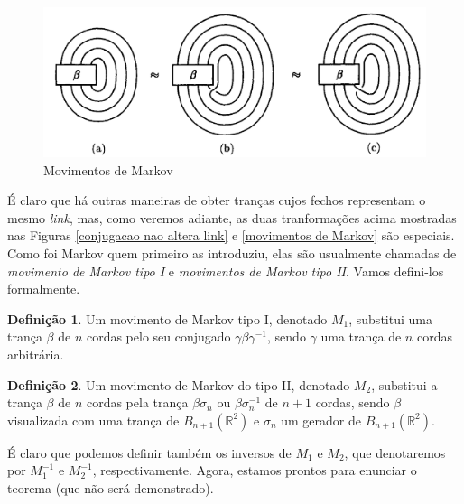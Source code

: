\documentclass[a4paper,portuguese,11pt,twoside, leqno]{book}
\theoremstyle{definition}
\newtheorem{deff}{Definição}[section]
\begin{document}
	\begin{figure}[H]
		\begin{center}
			\includegraphics[width=13cm]{movimentos_de_markov.png}
		\end{center}\caption{Movimentos de Markov}
		\label{movimentos de Markov}
	\end{figure}
	\par\vspace{0.3cm} É claro que há outras maneiras de obter tranças cujos fechos representam o mesmo \textit{link}, mas, como veremos adiante, as duas tranformações acima mostradas nas Figuras \eqref{conjugacao nao altera link} e \eqref{movimentos de Markov} são especiais. Como foi Markov quem primeiro as introduziu, elas são usualmente chamadas de \textit{movimento de Markov tipo I} e \textit{movimentos de Markov tipo II}. Vamos defini-los formalmente.
	\begin{deff}
		\label{def movimento de Markov tipo 1}
		Um movimento de Markov tipo I, denotado $M_1$, substitui uma trança $\beta$ de $n$ cordas pelo seu conjugado $\gamma\beta\gamma^{-1}$, sendo $\gamma$ uma trança de $n$ cordas arbitrária.  
	\end{deff}
	\begin{deff}
		\label{def movimento de Markov tipo 2}
		Um movimento de Markov do tipo II, denotado $M_2$, substitui a trança $\beta$ de $n$ cordas pela trança $\beta\sigma_n$ ou $\beta\sigma_n^{-1}$ de $n+1$ cordas, sendo $\beta$ visualizada com uma trança de $B_{n+1}(\mathbb{R}^2)$ e $\sigma_n$ um gerador de $B_{n+1}(\mathbb{R}^2)$. 
	\end{deff}
	\par\vspace{0.3cm} É claro que podemos definir também os inversos de $M_1$ e $M_2$, que denotaremos por $M_1^{-1}$ e $M_2^{-1}$, respectivamente. Agora, estamos prontos para enunciar o teorema (que não será demonstrado).
	
\end{document}
